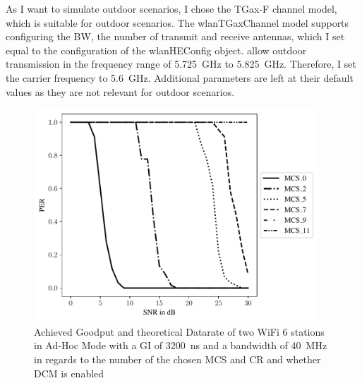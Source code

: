 As I want to simulate outdoor scenarios, I chose the TGax-F channel model, which is suitable for outdoor scenarios.
The wlanTGaxChannel model supports configuring the \ac{BW}, the number of transmit and receive antennas, which I set equal to the configuration of the wlanHEConfig object.
\cite{GermanLaw} allow outdoor transmission in the frequency range of \SI{5.725}{\giga\hertz} to \SI{5.825}{\giga\hertz}. Therefore, I set the carrier frequency to \SI{5.6}{\giga\hertz}.
Additional parameters are left at their default values as they are not relevant for outdoor scenarios.
\begin{figure}%
	\centering
	\includegraphics[width=0.95\textwidth]{figures/MCS_PER_to_SNR.pdf}
	\caption{Achieved Goodput and theoretical Datarate of two WiFi 6 stations in Ad-Hoc Mode with a \ac{GI} of \SI{3200}{\nano\second} and a bandwidth of \SI{40}{\mega\hertz} in regards to the number of the chosen \ac{MCS} and \ac{CR} and whether \ac{DCM} is enabled}%
	\label{fig:PER_SNR_MCS}%
\end{figure}


